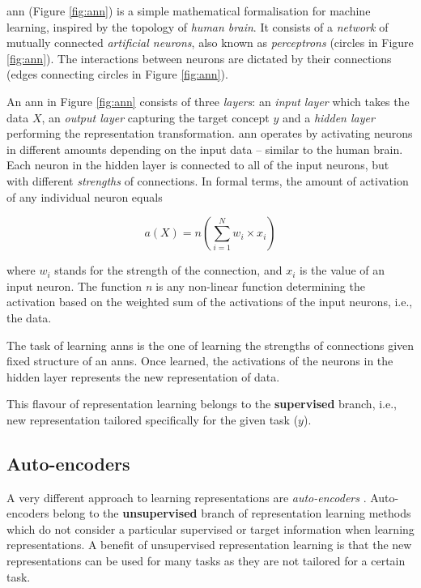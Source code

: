 \gls{ann} (Figure \ref{fig:ann}) is a simple mathematical formalisation for machine learning, inspired by the topology of  \textit{human brain}.
It consists of a \textit{network} of mutually connected \textit{artificial neurons}, also known as \textit{perceptrons} (circles in Figure \ref{fig:ann}).
The interactions between neurons are dictated by their connections (edges connecting circles in Figure \ref{fig:ann}).




An \gls{ann} in Figure \ref{fig:ann} consists of three \textit{layers}: an \textit{input layer} which takes the data $X$, an \textit{output layer} capturing the target concept $y$ and a \textit{hidden layer} performing the representation transformation.
\gls{ann} operates by activating neurons in different amounts depending on the input data -- similar to the human brain.
Each neuron in the hidden layer is connected to all of the input neurons, but with different \textit{strengths} of connections.
In formal terms, the amount of activation of any individual neuron equals

\begin{equation}
	a(X) = n(\sum_{i=1}^N w_i \times x_i)
\end{equation}

where $w_i$ stands for the strength of the connection, and $x_i$ is the value of an input neuron.
The function \textit{n} is any non-linear function determining the activation based on the weighted sum of the activations of the input neurons, i.e., the data.




The task of learning \gls{ann}s is the one of learning the strengths of connections given fixed structure of an \gls{ann}s.
Once learned, the activations of the neurons in the hidden layer represents the new representation of data.


This flavour of representation learning belongs to the \textbf{supervised} branch, i.e.,  new representation tailored specifically for the given task ($y$).




\subsection{Auto-encoders}


A very different approach to learning representations are \textit{auto-encoders} \cite{Hinton504}.
Auto-encoders belong to the \textbf{unsupervised} branch of representation learning methods which do not consider a particular supervised or target information when learning representations.
A benefit of unsupervised representation learning is that the new representations can be used for many tasks as they are not tailored for a certain task.


